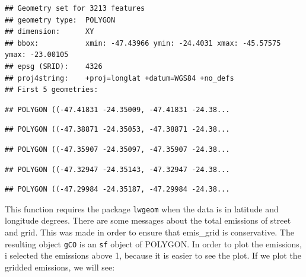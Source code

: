 \documentclass[12pt,graybox,envcountchap,sectrefs]{krantz}
\makeatletter
\newenvironment{Shaded}{\begin{snugshade}}{\end{snugshade}}
\newcommand{\KeywordTok}[1]{\textcolor[rgb]{0.13,0.29,0.53}{\textbf{#1}}}
\newcommand{\DataTypeTok}[1]{\textcolor[rgb]{0.13,0.29,0.53}{#1}}
\newcommand{\DecValTok}[1]{\textcolor[rgb]{0.00,0.00,0.81}{#1}}
\newcommand{\StringTok}[1]{\textcolor[rgb]{0.31,0.60,0.02}{#1}}
\newcommand{\OtherTok}[1]{\textcolor[rgb]{0.56,0.35,0.01}{#1}}
\newcommand{\OperatorTok}[1]{\textcolor[rgb]{0.81,0.36,0.00}{\textbf{#1}}}
\newcommand{\NormalTok}[1]{#1}
\newenvironment{kframe}{%
\medskip{}
\setlength{\fboxsep}{.8em}
 \def\at@end@of@kframe{}%
 \ifinner\ifhmode%
  \def\at@end@of@kframe{\end{minipage}}%
  \begin{minipage}{\columnwidth}%
 \fi\fi%
 \def\FrameCommand##1{\hskip\@totalleftmargin \hskip-\fboxsep
 \colorbox{shadecolor}{##1}\hskip-\fboxsep
     \hskip-\linewidth \hskip-\@totalleftmargin \hskip\columnwidth}%
 \MakeFramed {\advance\hsize-\width
   \@totalleftmargin\z@ \linewidth\hsize
   \@setminipage}}%
 {\par\unskip\endMakeFramed%
 \at@end@of@kframe}
\renewenvironment{Shaded}{\begin{kframe}}{\end{kframe}}
\theoremstyle{definition}
\theoremstyle{definition}
\theoremstyle{definition}
\theoremstyle{remark}
\makeatother
\begin{document}
\begin{verbatim}
## Geometry set for 3213 features 
## geometry type:  POLYGON
## dimension:      XY
## bbox:           xmin: -47.43966 ymin: -24.4031 xmax: -45.57575 ymax: -23.00105
## epsg (SRID):    4326
## proj4string:    +proj=longlat +datum=WGS84 +no_defs
## First 5 geometries:
\end{verbatim}

\begin{verbatim}
## POLYGON ((-47.41831 -24.35009, -47.41831 -24.38...
\end{verbatim}

\begin{verbatim}
## POLYGON ((-47.38871 -24.35053, -47.38871 -24.38...
\end{verbatim}

\begin{verbatim}
## POLYGON ((-47.35907 -24.35097, -47.35907 -24.38...
\end{verbatim}

\begin{verbatim}
## POLYGON ((-47.32947 -24.35143, -47.32947 -24.38...
\end{verbatim}

\begin{verbatim}
## POLYGON ((-47.29984 -24.35187, -47.29984 -24.38...
\end{verbatim}

This function requires the package \texttt{lwgeom} when the data is in
latitude and longitude degrees. There are some messages about the total
emissions of street and grid. This was made in order to ensure that
emis\_grid is conservative. The resulting object \texttt{gCO} is an
\texttt{sf} object of POLYGON. In order to plot the emissions, i
selected the emissions above 1, because it is easier to see the plot. If
we plot the gridded emissions, we will see:

\begin{Shaded}
\end{Shaded}
\end{document}
